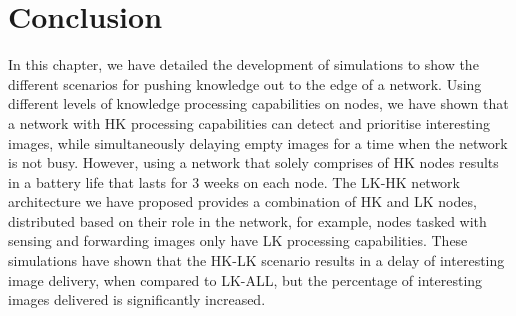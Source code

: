 


\section{Conclusion}
	
In this chapter, we have detailed the development of simulations to show the different scenarios for pushing knowledge out to the edge of a network. Using different levels of knowledge processing capabilities on nodes, we have shown that a network with HK processing capabilities can detect and prioritise interesting images, while simultaneously delaying empty images for a time when the network is not busy. However, using a network that solely comprises of HK nodes results in a battery life that lasts for 3 weeks on each node. The LK-HK network architecture we have proposed provides a combination of HK and LK nodes, distributed based on their role in the network, for example, nodes tasked with sensing and forwarding images only have LK processing capabilities. These simulations have shown that the HK-LK scenario results in a delay of interesting image delivery, when compared to LK-ALL, but the percentage of interesting images delivered is significantly increased.

